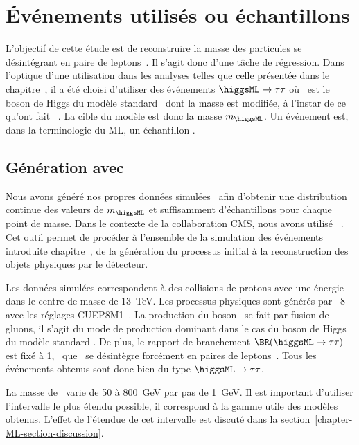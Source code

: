 \section{Événements utilisés ou échantillons}\label{chapter-ML-section-evt_gen}
L'objectif de cette étude est de reconstruire la masse des particules se désintégrant en paire de leptons~\tau.
Il s'agit donc d'une tâche de régression.
Dans l'optique d'une utilisation dans les analyses telles que celle présentée dans le chapitre~,
il a été choisi d'utiliser des événements
$\higgsML\to\tau\tau$
où \higgsML\ est le boson de Higgs du modèle standard \higgs\ dont la masse est modifiée,
à l'instar de ce qu'ont fait \citeauthor{BARTSCHI201929}~\cite{BARTSCHI201929}.
La cible du modèle est donc la masse $m_{\higgsML}$.
Un événement est, dans la terminologie du ML, un \og échantillon \fg.
\subsection{Génération avec \FASTSIM}\label{chapter-ML-section-evt_gen-FASTSIM}
Nous avons généré nos propres données simulées~\cite{fastsim_ece}
afin d'obtenir
une distribution continue des valeurs de $m_{\higgsML}$
et suffisamment d'échantillons pour chaque point de masse.
Dans le contexte de la collaboration CMS, nous avons utilisé \FASTSIM~\cite{FastSim_2011,FastSim_2014,FastSim_2017_1,FastSim_2017_2}.
Cet outil permet de procéder à l'ensemble de la simulation des événements introduite chapitre~,
de la génération du processus initial à la reconstruction des objets physiques par le détecteur.
\par
Les données simulées correspondent à des collisions de protons
avec une énergie dans le centre de masse de \SI{13}{\TeV}.
Les processus physiques sont générés par
\PYTHIA~8~\cite{pythia8.2}
avec les réglages CUEP8M1~\cite{tunes_2016,tunes_2019}.
La production du boson \higgsML\ se fait par fusion de gluons,
il s'agit du mode de production dominant dans le cas du boson de Higgs du modèle standard \higgs.
De plus, le rapport de branchement $\BR(\higgsML\to\tau\tau)$ est fixé à 1,
\ie\ que \higgsML\ se désintègre forcément en paires de leptons~\tau.
Tous les événements obtenus sont donc bien du type $\higgsML\to\tau\tau$.
\par
La masse de \higgsML\ varie de \num{50} à \SI{800}{\GeV} par pas de \SI{1}{\GeV}.
Il est important d'utiliser l'intervalle le plus étendu possible, il correspond à la gamme utile des modèles obtenus.
L'effet de l'étendue de cet intervalle est discuté dans la section~\ref{chapter-ML-section-discussion}.
